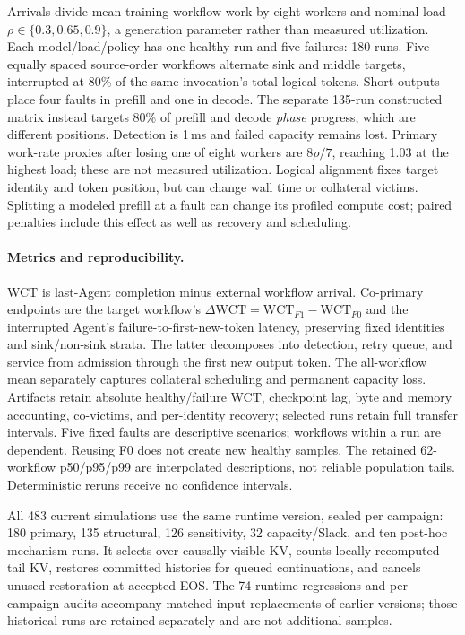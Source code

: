 Arrivals divide mean training workflow work by eight workers and nominal load
$\rho\in\{0.3,0.65,0.9\}$, a generation parameter rather than measured
utilization. Each model/load/policy has one healthy run and five failures:
180 runs. Five equally spaced source-order workflows alternate sink and middle
targets, interrupted at 80\% of the same invocation's total logical tokens.
Short outputs place four faults in prefill and one in decode. The separate
135-run constructed matrix instead targets 80\% of prefill and decode
\emph{phase} progress, which are different positions. Detection is 1\,ms and
failed capacity remains lost. Primary work-rate proxies after losing one of
eight workers are $8\rho/7$, reaching 1.03 at the highest load; these are not
measured utilization. Logical alignment fixes target identity and
token position, but can change wall time or collateral victims. Splitting a
modeled prefill at a fault can change its profiled compute cost; paired
penalties include this effect as well as recovery and scheduling.

\paragraph{Metrics and reproducibility.}
WCT is last-Agent completion minus external workflow arrival. Co-primary
endpoints are the target workflow's
$\Delta\mathrm{WCT}=\mathrm{WCT}_{F1}-\mathrm{WCT}_{F0}$ and the interrupted
Agent's failure-to-first-new-token latency, preserving fixed identities and
sink/non-sink strata. The latter decomposes into detection, retry queue, and
service from admission through the first new output token. The all-workflow
mean separately captures collateral scheduling and permanent capacity loss.
Artifacts retain absolute healthy/failure WCT, checkpoint lag, byte and memory
accounting, co-victims, and per-identity recovery; selected runs retain full
transfer intervals. Five fixed faults are descriptive scenarios; workflows
within a run are dependent. Reusing F0 does not create new healthy samples.
The retained 62-workflow p50/p95/p99 are interpolated descriptions, not reliable
population tails. Deterministic reruns receive no confidence intervals.

All 483 current simulations use the same runtime version, sealed per campaign:
180 primary, 135 structural,
126 sensitivity, 32 capacity/Slack, and ten post-hoc mechanism runs.
It selects over causally visible KV, counts locally recomputed tail KV, restores
committed histories for queued continuations, and cancels unused restoration at
accepted EOS. The 74 runtime regressions and per-campaign audits accompany
matched-input replacements of earlier versions; those historical runs are
retained separately and are not additional samples.

